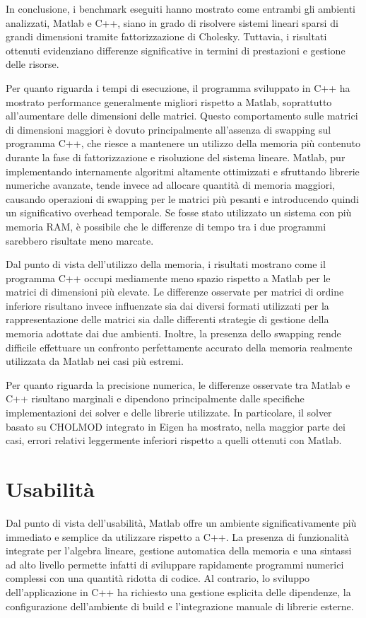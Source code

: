 In conclusione, i benchmark eseguiti hanno mostrato come entrambi gli ambienti analizzati, Matlab e C++,
siano in grado di risolvere sistemi lineari sparsi di grandi dimensioni tramite fattorizzazione di Cholesky.
Tuttavia, i risultati ottenuti evidenziano differenze significative in termini di prestazioni e gestione delle risorse.

Per quanto riguarda i tempi di esecuzione, il programma sviluppato in C++ ha mostrato performance generalmente migliori rispetto a Matlab, soprattutto all'aumentare delle dimensioni delle matrici.
Questo comportamento sulle matrici di dimensioni maggiori è dovuto principalmente all'assenza di swapping sul programma C++, che riesce a mantenere un utilizzo della memoria più contenuto durante la fase di fattorizzazione e risoluzione del sistema lineare.
Matlab, pur implementando internamente algoritmi altamente ottimizzati e sfruttando librerie numeriche avanzate, tende invece ad allocare quantità di memoria maggiori, causando operazioni di swapping per le matrici più pesanti e introducendo quindi un significativo overhead temporale.
Se fosse stato utilizzato un sistema con più memoria RAM, è possibile che le differenze di tempo tra i due programmi sarebbero risultate meno marcate.

Dal punto di vista dell'utilizzo della memoria, i risultati mostrano come il programma C++ occupi mediamente meno spazio rispetto a Matlab per le matrici di dimensioni più elevate.
Le differenze osservate per matrici di ordine inferiore risultano invece influenzate sia dai diversi formati utilizzati per la rappresentazione delle matrici sia dalle differenti strategie di gestione della memoria adottate dai due ambienti.
Inoltre, la presenza dello swapping rende difficile effettuare un confronto perfettamente accurato della memoria realmente utilizzata da Matlab nei casi più estremi.

Per quanto riguarda la precisione numerica, le differenze osservate tra Matlab e C++ risultano marginali e dipendono principalmente dalle specifiche implementazioni dei solver e delle librerie utilizzate.
In particolare, il solver basato su CHOLMOD integrato in Eigen ha mostrato, nella maggior parte dei casi, errori relativi leggermente inferiori rispetto a quelli ottenuti con Matlab.
\section{Usabilità}
Dal punto di vista dell'usabilità, Matlab offre un ambiente significativamente più immediato e semplice da utilizzare rispetto a C++.
La presenza di funzionalità integrate per l'algebra lineare,
gestione automatica della memoria e una sintassi ad alto livello permette infatti di sviluppare rapidamente programmi numerici complessi con una quantità ridotta di codice.
Al contrario, lo sviluppo dell'applicazione in C++ ha richiesto una gestione esplicita delle dipendenze,
la configurazione dell'ambiente di build e l'integrazione manuale di librerie esterne.


